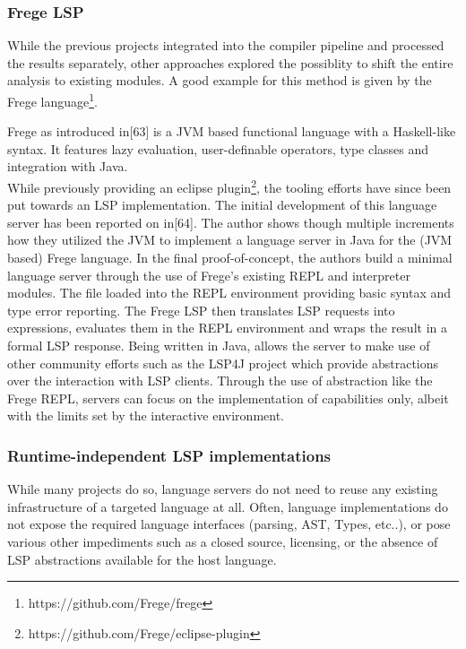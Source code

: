 \documentclass[
  a4paper,
  bibtex,
  english,
  nomenclature]{kthlatex/kththesis/kththesis}
\begin{document}
\hypertarget{sec:frege-lsp}{%
\subsubsection{Frege LSP}\label{sec:frege-lsp}}

While the previous projects integrated into the compiler pipeline and
processed the results separately, other approaches explored the
possiblity to shift the entire analysis to existing modules. A good
example for this method is given by the Frege language\footnote{https://github.com/Frege/frege}.

Frege as introduced in{[}63{]} is a JVM based functional language with a
Haskell-like syntax. It features lazy evaluation, user-definable
operators, type classes and integration with Java.\\
While previously providing an eclipse plugin\footnote{https://github.com/Frege/eclipse-plugin},
the tooling efforts have since been put towards an LSP implementation.
The initial development of this language server has been reported on
in{[}64{]}. The author shows though multiple increments how they
utilized the JVM to implement a language server in Java for the (JVM
based) Frege language. In the final proof-of-concept, the authors build
a minimal language server through the use of Frege's existing REPL and
interpreter modules. The file loaded into the REPL environment providing
basic syntax and type error reporting. The Frege LSP then translates LSP
requests into expressions, evaluates them in the REPL environment and
wraps the result in a formal LSP response. Being written in Java, allows
the server to make use of other community efforts such as the LSP4J
project which provide abstractions over the interaction with LSP
clients. Through the use of abstraction like the Frege REPL, servers can
focus on the implementation of capabilities only, albeit with the limits
set by the interactive environment.

\hypertarget{sec:runtime-independent-lsp-implementations}{%
\subsubsection{Runtime-independent LSP
implementations}\label{sec:runtime-independent-lsp-implementations}}

While many projects do so, language servers do not need to reuse any
existing infrastructure of a targeted language at all. Often, language
implementations do not expose the required language interfaces (parsing,
AST, Types, etc..), or pose various other impediments such as a closed
source, licensing, or the absence of LSP abstractions available for the
host language.
\end{document}
